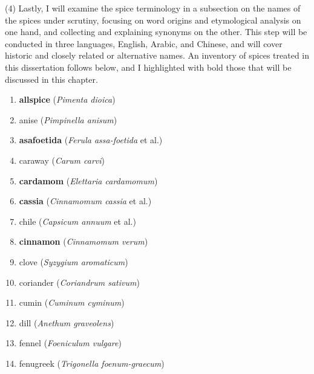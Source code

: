 (4) Lastly, I will examine the spice terminology in a subsection on the names of the spices under scrutiny, focusing on word origins and etymological analysis on one hand, and collecting and explaining synonyms on the other. This step will be conducted in three languages, English, Arabic, and Chinese, and will cover historic and closely related or alternative names. An inventory of spices treated in this dissertation follows below, and I highlighted with bold those that will be discussed in this chapter.

\clearpage

\begin{multicols}{2}
\begin{enumerate}
    \item \textbf{allspice} (\textit{Pimenta dioica}) \quad \hfill \pageref{sec:allspice}
    \item anise (\textit{Pimpinella anisum}) %
    \item \textbf{asafoetida} (\textit{Ferula assa-foetida} et al.) \quad \hfill \pageref{sec:asafoetida}
    \item caraway (\textit{Carum carvi}) %
    \item \textbf{cardamom} (\textit{Elettaria cardamomum}) \quad \hfill \pageref{sec:cardamom}
    \item \textbf{cassia} (\textit{Cinnamomum cassia} et al.) \quad \hfill \pageref{sec:cassia}
    \item chile (\textit{Capsicum annuum} et al.) %
    \item \textbf{cinnamon} (\textit{Cinnamomum verum}) \quad \hfill \pageref{sec:cinnamon}
    \item clove (\textit{Syzygium aromaticum}) %
    \item coriander (\textit{Coriandrum sativum}) %
    \item cumin (\textit{Cuminum cyminum}) %
    \item dill (\textit{Anethum graveolens}) %
    \item fennel (\textit{Foeniculum vulgare}) %
    \item fenugreek (\textit{\small Trigonella foenum-graecum}) %

\end{enumerate}
\end{multicols}
